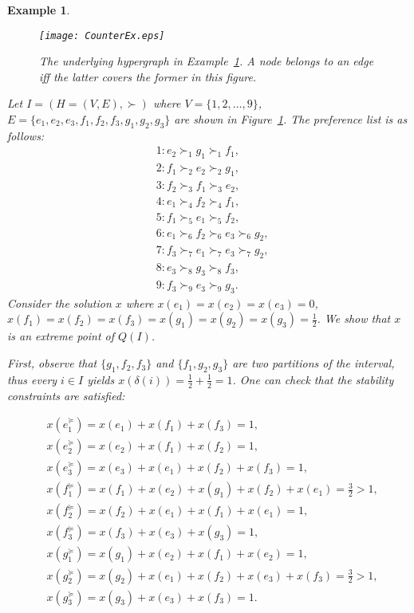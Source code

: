 \documentclass[11pt]{article}
\newtheorem{example}[theorem]{Example}
\begin{document}
\begin{example}\label{ex:Non-Integral-Ex}

\begin{figure}[h!]
    \centering
    \texttt{[image: CounterEx.eps]}
    \caption{The underlying hypergraph in Example~\ref{ex:Non-Integral-Ex}. A node belongs to an edge iff the latter covers the former in this figure.}
    \label{fig:Non-Integral-Ex}
\end{figure}
    Let $I=(H=(V,E),\succ)$ where $V=\{1,2,\dots,9\}$, $E=\{e_1,e_2,e_3,f_1,f_2,f_3,g_1,g_2,g_3\}$ are shown in Figure~\ref{fig:Non-Integral-Ex}. The preference list is as follows:
    \begin{equation*}
        \begin{split}
            & 1: e_2 \succ_1 g_1 \succ_1 f_1 ,\\
            & 2: f_1 \succ_2 e_2 \succ_2 g_1 ,\\
            & 3: f_2 \succ_3 f_1 \succ_3 e_2 ,\\
            & 4: e_1 \succ_4 f_2 \succ_4 f_1 ,\\
            & 5: f_1 \succ_5 e_1 \succ_5 f_2 ,\\
            & 6: e_1 \succ_6 f_2 \succ_6 e_3 \succ_6 g_2 ,\\
            & 7: f_3 \succ_7 e_1 \succ_7 e_3 \succ_7 g_2 ,\\
            & 8: e_3 \succ_8 g_3 \succ_8 f_3 ,\\
            & 9: f_3 \succ_9 e_3 \succ_9 g_3 . 
        \end{split}
    \end{equation*}
    Consider the solution $x$ where $x(e_1)=x(e_2)=x(e_3)=0$, $x(f_1)=x(f_2)=x(f_3)=x(g_1)=x(g_2)=x(g_3)=\frac{1}{2}$. We show that $x$ is an extreme point of $Q(I)$.

    First, observe that $\{g_1,f_2,f_3\}$ and $\{f_1,g_2,g_3\}$ are two partitions of the interval, thus every $i\in I$ yields $x(\delta(i))=\frac{1}{2}+\frac{1}{2}=1$. One can check that the stability constraints are satisfied:

    \begin{equation*}
        \begin{split}
            & x(e_1^\succeq)=x(e_1)+x(f_1)+x(f_3)=1 ,\\
            & x(e_2^\succeq)=x(e_2)+x(f_1)+x(f_2)=1 ,\\
            & x(e_3^\succeq)=x(e_3)+x(e_1)+x(f_2)+x(f_3)=1 ,\\
            & x(f_1^\succeq)=x(f_1)+x(e_2)+x(g_1)+x(f_2)+x(e_1)=\frac{3}{2}>1 ,\\
            & x(f_2^\succeq)=x(f_2)+x(e_1)+x(f_1)+x(e_1)=1 ,\\
            & x(f_3^\succeq)=x(f_3)+x(e_3)+x(g_3)=1 ,\\
            & x(g_1^\succeq)=x(g_1)+x(e_2)+x(f_1)+x(e_2)=1 ,\\
            & x(g_2^\succeq)=x(g_2)+x(e_1)+x(f_2)+x(e_3)+x(f_3)=\frac{3}{2}>1 ,\\
            & x(g_3^\succeq)=x(g_3)+x(e_3)+x(f_3)=1 . 
        \end{split}
    \end{equation*}


\end{example}
\end{document}
